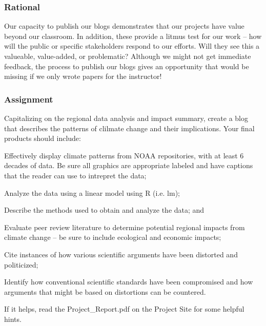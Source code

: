 
\subsubsection{Rational}

Our capacity to publish our blogs demonstrates that our projects have value beyond our classroom. In addition, these provide a litmus test for our work -- how will the public or specific stakeholders respond to our efforts. Will they see this a valueable, value-added, or problematic?  Although we might not get immediate feedback, the process to publish our blogs gives an opportunity that would be missing if we only wrote papers for the instructor!


\subsubsection{Assignment}

Capitalizing on the regional data analysis and impact summary, create a blog that describes the patterns of clilmate change and their implications. Your final products should include:

\begin{itemize*}
  \item Effectively display climate patterns from NOAA repositories, with at least 6 decades of data. Be sure all graphics are appropriate labeled and have captions that the reader can use to intrepret the data;
  \item Analyze the data using a linear model using R (i.e. lm);
  \item Describe the methods used to obtain and analyze the data; and
  \item Evaluate peer review literature to determine potential regional impacts from climate change -- be sure to include ecological and economic impacts; 
  \item Cite instances of how various scientific arguments have been distorted and politicized;
  \item Identify how conventional scientific standards have been compromised and how arguments that might be based on distortions can be countered.
\end{itemize*}

If it helps, read the Project\_Report.pdf on the Project Site for some helpful hints.

